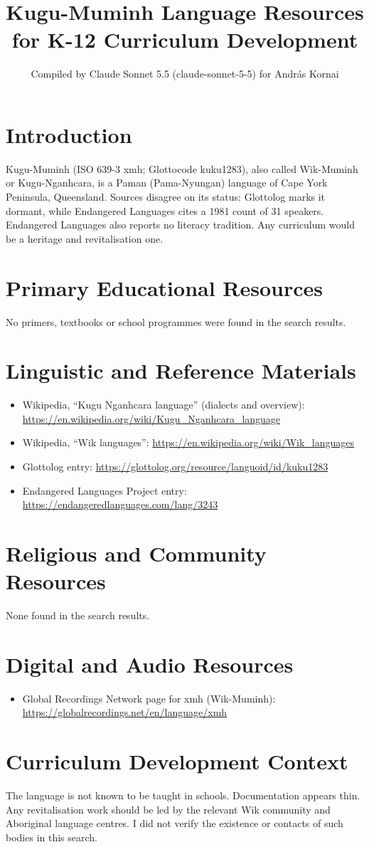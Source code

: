 \documentclass[12pt]{article}
\title{Kugu-Muminh Language Resources for K-12 Curriculum Development}
\author{Compiled by Claude Sonnet 5.5 (claude-sonnet-5-5) for Andr\'as Kornai}
\date{}
\begin{document}
\maketitle

\section{Introduction}
Kugu-Muminh (ISO 639-3 xmh; Glottocode kuku1283), also called Wik-Muminh or Kugu-Nganhcara, is a Paman (Pama-Nyungan) language of Cape York Peninsula, Queensland. Sources disagree on its status: Glottolog marks it dormant, while Endangered Languages cites a 1981 count of 31 speakers. Endangered Languages also reports no literacy tradition. Any curriculum would be a heritage and revitalisation one.

\section{Primary Educational Resources}
No primers, textbooks or school programmes were found in the search results.

\section{Linguistic and Reference Materials}
\begin{itemize}
\item Wikipedia, ``Kugu Nganhcara language'' (dialects and overview): \url{https://en.wikipedia.org/wiki/Kugu_Nganhcara_language}
\item Wikipedia, ``Wik languages'': \url{https://en.wikipedia.org/wiki/Wik_languages}
\item Glottolog entry: \url{https://glottolog.org/resource/languoid/id/kuku1283}
\item Endangered Languages Project entry: \url{https://endangeredlanguages.com/lang/3243}
\end{itemize}

\section{Religious and Community Resources}
None found in the search results.

\section{Digital and Audio Resources}
\begin{itemize}
\item Global Recordings Network page for xmh (Wik-Muminh): \url{https://globalrecordings.net/en/language/xmh}
\end{itemize}

\section{Curriculum Development Context}
The language is not known to be taught in schools. Documentation appears thin. Any revitalisation work should be led by the relevant Wik community and Aboriginal language centres. I did not verify the existence or contacts of such bodies in this search.
\end{document}
